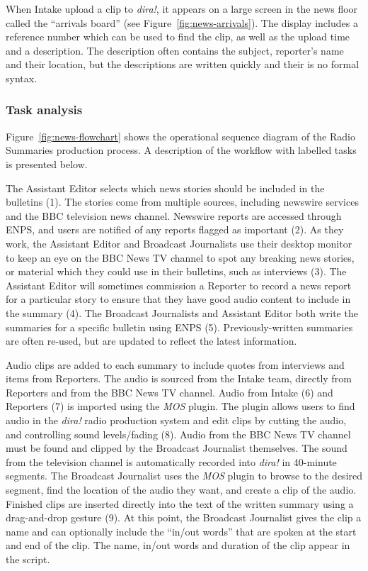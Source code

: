 When Intake upload a clip to \textit{dira!}, it appears on a large screen in the news floor called the ``arrivals
board'' (see Figure~\ref{fig:news-arrivals}). The display includes a reference number which can be used to find the
clip, as well as the upload time and a description. The description often contains the subject, reporter's name and
their location, but the descriptions are written quickly and their is no formal syntax.

\subsubsection{Task analysis}
Figure~\ref{fig:news-flowchart} shows the operational sequence diagram of the Radio Summaries production process. A
description of the workflow with labelled tasks is presented below.

The Assistant Editor selects which news stories should be included in the bulletins (1). The stories come from multiple
sources, including newswire services and the BBC television news channel.  Newswire reports are accessed through ENPS,
and users are notified of any reports flagged as important (2).  As they work, the Assistant Editor and Broadcast
Journalists use their desktop monitor to keep an eye on the BBC News TV channel to spot any breaking news stories, or
material which they could use in their bulletins, such as interviews (3).  The Assistant Editor will sometimes
commission a Reporter to record a news report for a particular story to ensure that they have good audio content to
include in the summary (4). The Broadcast Journalists and Assistant Editor both write the summaries for a specific
bulletin using ENPS (5).  Previously-written summaries are often re-used, but are updated to reflect the latest
information.

Audio clips are added to each summary to include quotes from interviews and items from Reporters. The audio is sourced
from the Intake team, directly from Reporters and from the BBC News TV channel. Audio from Intake (6) and Reporters (7) is
imported using the \textit{MOS} plugin. The plugin allows users to find audio in the \textit{dira!} radio production
system and edit clips by cutting the audio, and controlling sound levels/fading (8).  Audio from the BBC News TV
channel must be found and clipped by the Broadcast Journalist themselves. The sound from the television channel is
automatically recorded into \textit{dira!} in 40-minute segments. The Broadcast Journalist uses the \textit{MOS} plugin
to browse to the desired segment, find the location of the audio they want, and create a clip of the audio.  Finished
clips are inserted directly into the text of the written summary using a drag-and-drop gesture (9). At this point, the
Broadcast Journalist gives the clip a name and can optionally include the ``in/out words'' that are spoken at the start
and end of the clip.  The name, in/out words and duration of the clip appear in the script.

